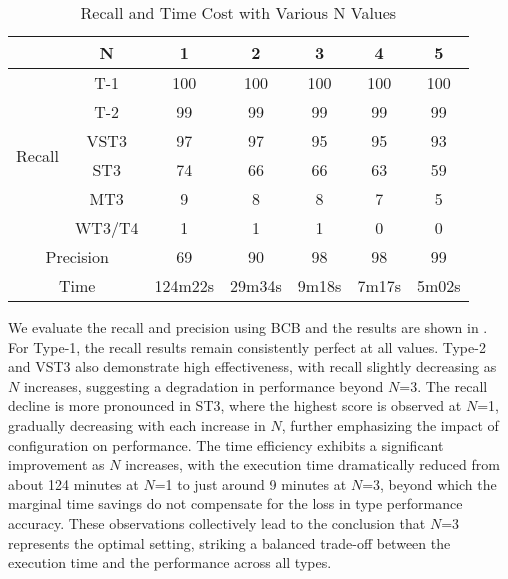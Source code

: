 \begin{table}[h]
\centering
\caption{ Recall and Time Cost with Various N Values }
\begin{tabular}{cc|ccccc}
\hline
&\textbf{N} & \textbf{1} & \textbf{2} & \textbf{3} & \textbf{4} & \textbf{5} \\ \hline
\multirow{6}{*}{Recall} 
                        &T-1 & 100 & 100 & 100 & 100 & 100 \\
                        &T-2 & 99 & 99 & 99 & 99 & 99 \\
                        &VST3 & 97 & 97 & 95 & 95 & 93 \\
                        &ST3 & 74 & 66 & 66 & 63 & 59 \\
                        &MT3 & 9  & 8 & 8 & 7 & 5 \\
                        &WT3/T4  & 1  & 1 & 1 & 0 & 0\\
\hline
\multicolumn{2}{c|}{Precision} & 69 & 90 & 98 & 98 & 99 \\
\hline
\multicolumn{2}{c|}{Time}  & 124m22s & 29m34s & 9m18s & 7m17s & 5m02s \\ 
\hline
\end{tabular}
\label{table:param_n}
\end{table}

We evaluate the recall and precision using BCB and the results are shown in . 
For Type-1, the recall results remain consistently perfect at all values. 
Type-2 and VST3 also demonstrate high effectiveness, with recall slightly decreasing as $N$ increases, suggesting a degradation in performance beyond $N$=3. 
The recall decline is more pronounced in ST3, where the highest score is observed at $N$=1, gradually decreasing with each increase in $N$, further emphasizing the impact of configuration on performance. 
The time efficiency exhibits a significant improvement as $N$ increases, with the execution time dramatically reduced from about 124 minutes at $N$=1 to just around 9 minutes at $N$=3, beyond which the marginal time savings do not compensate for the loss in type performance accuracy. 
These observations collectively lead to the conclusion that $N$=3 represents the optimal setting, striking a balanced trade-off between the execution time and the performance across all types. 

